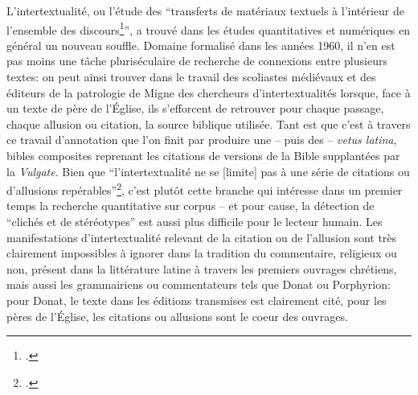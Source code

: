 L'intertextualité, ou l'étude des \enquote{transferts de matériaux textuels à l'intérieur de l'ensemble des discours\footcite{aron_intertextualite_2010}}, a trouvé dans les études quantitatives et numériques en général un nouveau souffle. Domaine formalisé dans les années 1960, il n'en est pas moins une tâche pluriséculaire de recherche de connexions entre plusieurs textes: on peut ainsi trouver dans le travail des scoliastes médiévaux et des éditeurs de la patrologie de Migne des chercheurs d'intertextualités lorsque, face à un texte de père de l'Église, ils s'efforcent de retrouver pour chaque passage, chaque allusion ou citation, la source biblique utilisée. Tant est que c'est à travers ce travail d'annotation que l'on finit par produire une -- puis des -- \textit{vetus latina}, bibles composites reprenant les citations de versions de la Bible supplantées par la \textit{Vulgate}. Bien que \enquote{l'intertextualité ne se [limite] pas à une série de citations ou d'allusions repérables}\footcite{aron_intertextualite_2010}, c'est plutôt cette branche qui intéresse dans un premier temps la recherche quantitative sur corpus -- et pour cause, la détection de \enquote{clichés et de stéréotypes} est aussi plus difficile pour le lecteur humain. Les manifestations d'intertextualité relevant de la citation ou de l'allusion sont très clairement impossibles à ignorer dans la tradition du commentaire, religieux ou non, présent dans la littérature latine à travers les premiers ouvrages chrétiens, mais aussi les grammairiens ou commentateurs tels que Donat ou Porphyrion: pour Donat, le texte dans les éditions transmises est clairement cité, pour les pères de l'Église, les citations ou allusions sont le coeur des ouvrages. 

